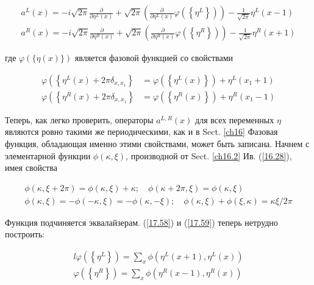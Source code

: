 \documentclass[main.tex]{subfiles}
\begin{document}
\begin{equation}\label{17.56}
	\begin{array}{l}{a^{L}(x)=-i \sqrt{2 \pi} \frac{\partial}{\partial \eta^{L}(x)}+\sqrt{2 \pi}\left(\frac{\partial}{\partial \eta^{L}(x)} \varphi\left(\left\{\eta^{L}\right\}\right)\right)-\frac{1}{\sqrt{2 \pi}} \eta^{L}(x-1)} \\ {a^{R}(x)=-i \sqrt{2 \pi} \frac{\partial}{\partial \eta^{R}(x)}+\sqrt{2 \pi}\left(\frac{\partial}{\partial \eta^{R}(x)} \varphi\left(\left\{\eta^{R}\right\}\right)\right)-\frac{1}{\sqrt{2 \pi}} \eta^{R}(x+1)}\end{array}
\end{equation}

где $\varphi(\{\eta(x)\})$ является фазовой функцией со свойствами

\begin{equation}\label{17.58}
	\begin{aligned} \varphi\left(\left\{\eta^{L}(x)+2 \pi \delta_{x, x_{1}}\right\}\right.&=\varphi\left(\left\{\eta^{L}(x)\right\}\right)+\eta^{L}\left(x_{1}+1\right) \\ \varphi\left(\left\{\eta^{R}(x)+2 \pi \delta_{x, x_{1}}\right\}\right.&=\varphi\left(\left\{\eta^{R}(x)\right\}\right)+\eta^{R}\left(x_{1}-1\right) \end{aligned}
\end{equation}

Теперь, как легко проверить, операторы $a^{L, R}(x)$ для всех переменных $\eta$ являются ровно такими же периодическими, как и в Sect. \ref{ch16}
Фазовая функция, обладающая именно этими свойствами, может быть записана. Начнем с элементарной функции $\phi(\kappa, \xi)$, производной от Sect. \ref{ch16.2} Ив. (\ref{16.28}), имея свойства

\begin{equation}\label{17.60}
\begin{array}{l}
{\phi(\kappa, \xi+2 \pi)=\phi(\kappa, \xi)+\kappa ; \quad \phi(\kappa+2 \pi, \xi)=\phi(\kappa, \xi)} \\
{\phi(\kappa, \xi)=-\phi(-\kappa, \xi)=-\phi(\kappa,-\xi) ; \quad \phi(\kappa, \xi)+\phi(\xi, \kappa)=\kappa \xi / 2 \pi}
\end{array}
\end{equation}

Функция подчиняется эквалайзерам. (\ref{17.58}) и (\ref{17.59}) теперь нетрудно построить:

\begin{equation}\label{17.62}
	\begin{aligned}{l}{\varphi\left(\left\{\eta^{L}\right\}\right)=\sum_{x} \phi\left(\eta^{L}(x+1), \eta^{L}(x)\right)} \\ {\varphi\left(\left\{\eta^{R}\right\}\right)=\sum_x \phi\left(\eta^{R}(x-1), \eta^{R}(x)\right)}\end{aligned}
\end{equation}
\end{document}
